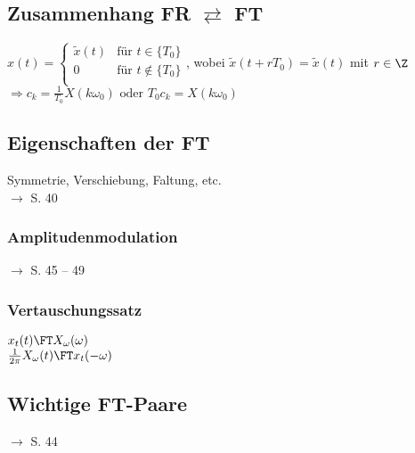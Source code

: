 \documentclass[german]{latex4ei/latex4ei_sheet}
\renewcommand{\diff}{\mathop{}\!\mathrm{\vphantom( d}}
\begin{document}
\begin{minipage}{\columnwidth}
\begin{sectionbox}
		\subsection*{Zusammenhang FR $\rightleftarrows$ FT}
		$x(t) = \begin{cases}
			\tilde{x}(t) & \text{für } t \in \{T_0\}\\
			0 & \text{für } t \notin \{T_0\}\\
		\end{cases}$, wobei $\tilde{x}(t + r T_0) = \tilde{x}(t)$ mit $r \in \Z$\\
		$\Rightarrow \boxed{
			c_k = \frac{1}{T_0} X(k \omega_0) \text{ oder } T_0 c_k = X(k \omega_0)	
		}$
		
		\subsection*{Eigenschaften der FT}
		Symmetrie, Verschiebung, Faltung, etc.\\
		$\rightarrow$ S. 40
		
			\subsubsection*{Amplitudenmodulation}
			$\rightarrow$ S. 45 -- 49
			
			\subsubsection*{Vertauschungssatz}
			$x_t(t) \FT X_{\omega}(\omega)$\\
			$\frac{1}{2 \pi} X_{\omega}(t) \FT x_t(-\omega)$
			
		\subsection*{Wichtige FT-Paare}
		$\rightarrow$ S. 44

%	
%	
%	

\end{sectionbox}
\end{minipage}
\end{document}
